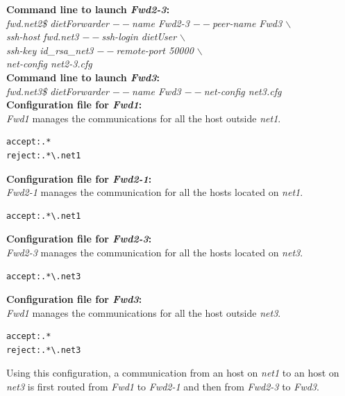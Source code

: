 \noindent\textbf{Command line to launch \textit{Fwd2-3}: }\\
{\small \it fwd.net2\$ dietForwarder {\tiny$--$}name Fwd2-3
  {\tiny$--$}peer-name Fwd3 $\backslash$\\
  \hspace*{4.2cm}{\tiny$--$}ssh-host fwd.net3 {\tiny$--$}ssh-login
  dietUser $\backslash$\\
  \hspace*{4.2cm}{\tiny$--$}ssh-key id\_rsa\_net3
  {\tiny$--$}remote-port 50000 $\backslash$\\
  \hspace*{4.2cm}{\tiny$--$}net-config net2-3.cfg}\\[2mm]

\noindent\textbf{Command line to launch \textit{Fwd3}: }\\
{\small \it fwd.net3\$ dietForwarder {\tiny$--$}name Fwd3
  {\tiny$--$}net-config net3.cfg}\\[3mm]

\noindent\textbf{Configuration file for \textit{Fwd1}:}\\
\textit{Fwd1} manages the communications for all the host outside
\textit{net1}.
\begin{verbatim}
accept:.*
reject:.*\.net1
\end{verbatim}

\noindent\textbf{Configuration file for \textit{Fwd2-1}:}\\
\textit{Fwd2-1} manages the communication for all the hosts located on
\textit{net1}.
\begin{verbatim}
accept:.*\.net1
\end{verbatim}

\noindent\textbf{Configuration file for \textit{Fwd2-3}:}\\
\textit{Fwd2-3} manages the communication for all the hosts located on
\textit{net3}.
\begin{verbatim}
accept:.*\.net3
\end{verbatim}

\noindent\textbf{Configuration file for \textit{Fwd3}:}\\
\textit{Fwd1} manages the communications for all the host outside
\textit{net3}.
\begin{verbatim}
accept:.*
reject:.*\.net3
\end{verbatim}

Using this configuration, a communication from an host on \textit{net1}
to an host on \textit{net3} is first routed from \textit{Fwd1} to
\textit{Fwd2-1} and then from \textit{Fwd2-3} to \textit{Fwd3}.
